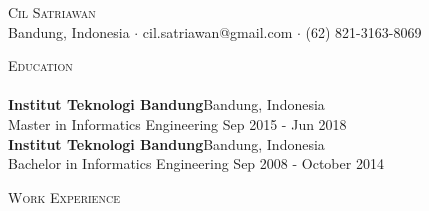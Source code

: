 \documentclass[a4paper]{article}
\newcommand{\lineunder} {
    \vspace*{-8pt} \\
    \hspace*{-18pt} \hrulefill \\
}
\newcommand{\header} [1] {
    {\hspace*{-18pt}\vspace*{6pt} \textsc{#1}}
    \vspace*{-6pt} \lineunder
}
\begin{document}
\vspace*{-40pt}

    

\vspace*{-10pt}
\begin{center}
	{\Huge \scshape {Cil Satriawan}}\\
	Bandung, Indonesia $\cdot$ cil.satriawan@gmail.com $\cdot$ (62) 821-3163-8069\\
\end{center}

\header{Education}
\vspace{1mm}
\textbf{Institut Teknologi Bandung}\hfill Bandung, Indonesia\\
Master in Informatics Engineering \hfill Sep 2015 - Jun 2018\\
\vspace{5mm}
\textbf{Institut Teknologi Bandung}\hfill Bandung, Indonesia\\
Bachelor in Informatics Engineering \hfill Sep 2008 - October 2014\\
\vspace{5mm}

\header{Work Experience}
\vspace{1mm}
\end{document}

